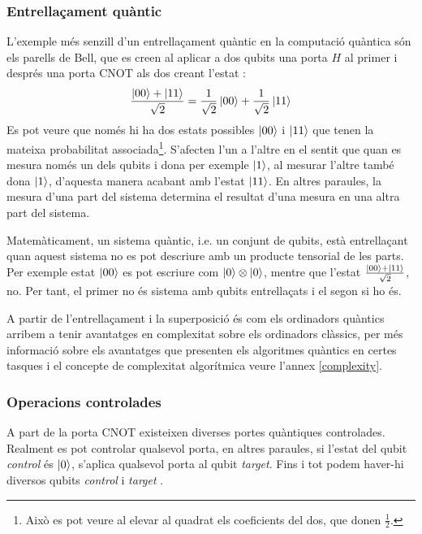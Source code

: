 \subsubsection{Entrellaçament quàntic}
L'exemple més senzill d'un entrellaçament quàntic en la computació quàntica són els parells de Bell, que es creen al aplicar a dos qubits una porta $H$ al primer i després una porta $\mathrm{CNOT}$ als dos creant l'estat \cite{QCandQI:entangle}:
$$
\frac{\ket{00}+\ket{11}}{\sqrt{2}} = \frac{1}{\sqrt{2}}\ket{00} + \frac{1}{\sqrt{2}}\ket{11}
$$
Es pot veure que només hi ha dos estats possibles $\ket{00}$ i $\ket{11}$ que tenen la mateixa probabilitat associada\footnote{Això es pot veure al elevar al quadrat els coeficients del dos, que donen $\frac{1}{2}$.}. S'afecten l'un a l'altre en el sentit que quan es mesura només un dels qubits i dona per exemple $\ket{1}$, al mesurar l'altre també dona $\ket{1}$, d'aquesta manera acabant amb l'estat $\ket{11}$. En altres paraules, la mesura d'una part del sistema determina el resultat d'una mesura en una altra part del sistema.

Matemàticament, un sistema quàntic, i.e. un conjunt de qubits, està entrellaçant quan aquest sistema no es pot descriure amb un producte tensorial de les parts. Per exemple estat $\ket{00}$ es pot escriure com $\ket{0}\otimes\ket{0}$, mentre que l'estat $\frac{\ket{00} + \ket{11}}{\sqrt{2}}$, no. Per tant, el primer no és sistema amb qubits entrellaçats i el segon si ho és.

A partir de l'entrellaçament i la superposició és com els ordinadors quàntics arribem a tenir avantatges en complexitat sobre els ordinadors clàssics, per més informació sobre els avantatges que presenten els algoritmes quàntics en certes tasques i el concepte de complexitat algorítmica veure l'annex \ref{complexity}.

\subsubsection{Operacions controlades}
A part de la porta $\mathrm{CNOT}$ existeixen diverses portes quàntiques controlades. Realment es pot controlar qualsevol porta, en altres paraules, si l'estat del qubit \textit{control} és $\ket{0}$, s'aplica qualsevol porta al qubit \textit{target}. Fins i tot podem haver-hi diversos qubits \textit{control} i \textit{target} \cite{QCandQI:controlled}.

